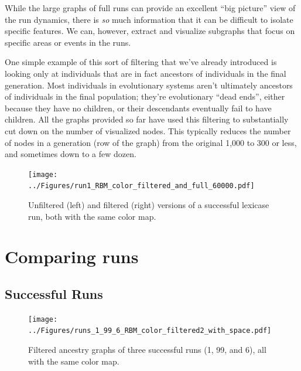 \documentclass{sig-alternate}
\begin{document}
While the large graphs of full runs can provide an excellent ``big picture'' 
view of the run dynamics, there is \emph{so} much information that it can be
difficult to isolate specific features. We can, however, extract and visualize
subgraphs that focus on specific areas or events in the runs.

One simple example of this sort of filtering that we've already introduced is
looking only at individuals that are in fact ancestors of individuals in the
final generation. Most individuals in evolutionary systems aren't ultimately
ancestors of individuals in the final population; they're evolutionary ``dead ends'',
either because they have no children, or their descendants eventually fail to have
children. All the graphs provided so far have used this filtering to substantially
cut down on the number of visualized nodes. This typically reduces the number of nodes in a
generation (row of the graph) from the original 1,000 to 300 or less, and sometimes down
to a few dozen.

\begin{figure}[tb]
	\begin{center}
		\texttt{[image: ../Figures/run1\_RBM\_color\_filtered\_and\_full\_60000.pdf]}
	\end{center}
	\caption{Unfiltered (left) and filtered (right) versions of a successful lexicase run, both with the same color map.}
	\label{fig:lexRun1FilteredAndFull}
\end{figure}


\section{Comparing runs}
\label{sec:comparisons}

\subsection{Successful Runs}
\begin{figure}[tb]
	\begin{center}
		\texttt{[image: ../Figures/runs\_1\_99\_6\_RBM\_color\_filtered2\_with\_space.pdf]}
	\end{center}
	\caption{Filtered ancestry graphs of three successful runs (1, 99, and 6), all with the same color map.}
	\label{fig:runs1:99:6:filtered}
\end{figure}
\end{document}
